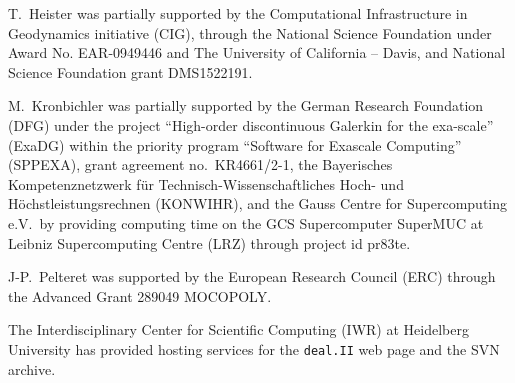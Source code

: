 \documentclass{ansarticle-preprint}
\newcommand{\specialword}[1]{\texttt{#1}}
\newcommand{\dealii}{{\specialword{deal.II}}}
\begin{document}
T.~Heister was partially supported by the Computational Infrastructure in
Geodynamics initiative (CIG), through the National Science Foundation
under Award No. EAR-0949446 and The University of California -- Davis, and National Science Foundation grant DMS1522191.

M.~Kronbichler was partially supported by the German Research Foundation (DFG)
under the project ``High-order discontinuous Galerkin for the exa-scale''
(ExaDG) within the priority program ``Software for Exascale Computing''
(SPPEXA), grant agreement no.~KR4661/2-1, the Bayerisches Kompetenznetzwerk
f\"ur Technisch-Wissenschaftliches Hoch- und H\"ochstleistungsrechnen
(KONWIHR), and the Gauss Centre for Supercomputing e.V.~by providing computing
time on the GCS Supercomputer SuperMUC at Leibniz Supercomputing Centre (LRZ)
through project id pr83te.

J-P.~Pelteret was supported by the European Research Council (ERC) through the Advanced Grant 289049 MOCOPOLY.

The Interdisciplinary Center for Scientific Computing (IWR) at Heidelberg University has provided
hosting services for the \dealii{} web page and the SVN archive.


{}

\end{document}
